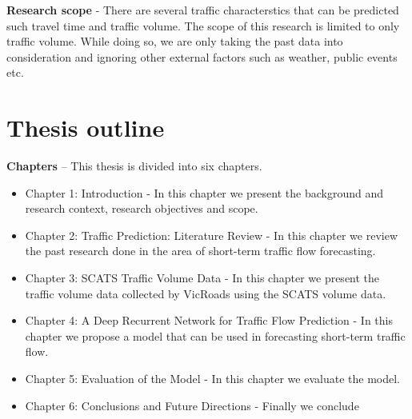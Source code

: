 \textbf{Research scope} - There are several traffic characterstics that can be predicted such travel
time and traffic volume. The scope of this research is limited to only traffic volume. While doing
so, we are only taking the past data into consideration and ignoring other external factors such as
weather, public events etc.


\section{Thesis outline}

\textbf{Chapters} -- This thesis is divided into six chapters.

\begin{itemize}
\item Chapter 1: Introduction - In this chapter we present the background and research context,
research objectives and scope.

\item Chapter 2: Traffic Prediction: Literature Review - In this chapter we review
the past research done in the area of short-term traffic flow forecasting.

\item Chapter 3: SCATS Traffic Volume Data - In this chapter we present the traffic volume data
collected by VicRoads using the SCATS volume data.

\item Chapter 4: A Deep Recurrent Network for Traffic Flow Prediction - In this chapter we propose a model that can be used in forecasting short-term traffic flow.

\item Chapter 5: Evaluation of the Model - In this chapter we evaluate the model.

\item Chapter 6: Conclusions and Future Directions - Finally we conclude
\end{itemize}
